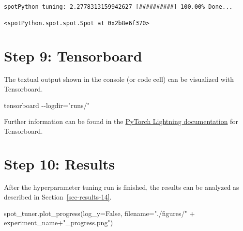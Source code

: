 \documentclass[
  letterpaper,
  DIV=11,
  numbers=noendperiod]{scrreprt}
\newenvironment{Shaded}{\begin{snugshade}}{\end{snugshade}}
\newcommand{\NormalTok}[1]{\textcolor[rgb]{0.00,0.23,0.31}{#1}}
\newcommand{\OperatorTok}[1]{\textcolor[rgb]{0.37,0.37,0.37}{#1}}
\newcommand{\StringTok}[1]{\textcolor[rgb]{0.13,0.47,0.30}{#1}}
\newcommand{\VariableTok}[1]{\textcolor[rgb]{0.07,0.07,0.07}{#1}}
\begin{document}
\begin{verbatim}
spotPython tuning: 2.2778313159942627 [##########] 100.00% Done...
\end{verbatim}

\begin{verbatim}
<spotPython.spot.spot.Spot at 0x2b8e6f370>
\end{verbatim}

\hypertarget{sec-tensorboard-31}{%
\section{Step 9: Tensorboard}\label{sec-tensorboard-31}}

The textual output shown in the console (or code cell) can be visualized
with Tensorboard.

\begin{Shaded}
\begin{Highlighting}[]
\NormalTok{tensorboard {-}{-}logdir="runs/"}
\end{Highlighting}
\end{Shaded}

Further information can be found in the
\href{https://lightning.ai/docs/pytorch/stable/api/lightning.pytorch.loggers.tensorboard.html}{PyTorch
Lightning documentation} for Tensorboard.

\hypertarget{sec-results-31}{%
\section{Step 10: Results}\label{sec-results-31}}

After the hyperparameter tuning run is finished, the results can be
analyzed as described in Section~\ref{sec-results-14}.

\begin{Shaded}
\begin{Highlighting}[]
\NormalTok{spot\_tuner.plot\_progress(log\_y}\OperatorTok{=}\VariableTok{False}\NormalTok{,}
\NormalTok{    filename}\OperatorTok{=}\StringTok{"./figures/"} \OperatorTok{+}\NormalTok{ experiment\_name}\OperatorTok{+}\StringTok{"\_progress.png"}\NormalTok{)}
\end{Highlighting}
\end{Shaded}
\end{document}
